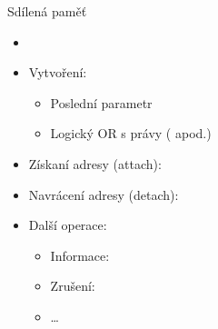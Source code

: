 \begin{frame}{Sdílená paměť}

  \begin{itemize}
    \item {}
    \item Vytvoření: 
    \begin{itemize}
      \item Poslední parametr 
      \item Logický OR s právy ( apod.)
    \end{itemize}

    \pause

    \item Získaní adresy (attach): 
    \item Navrácení adresy (detach): 

    \pause

    \item Další operace: 
    \begin{itemize}
      \item Informace: 
      \item Zrušení: 
      \item \dots
    \end{itemize}
  \end{itemize}

\end{frame}

